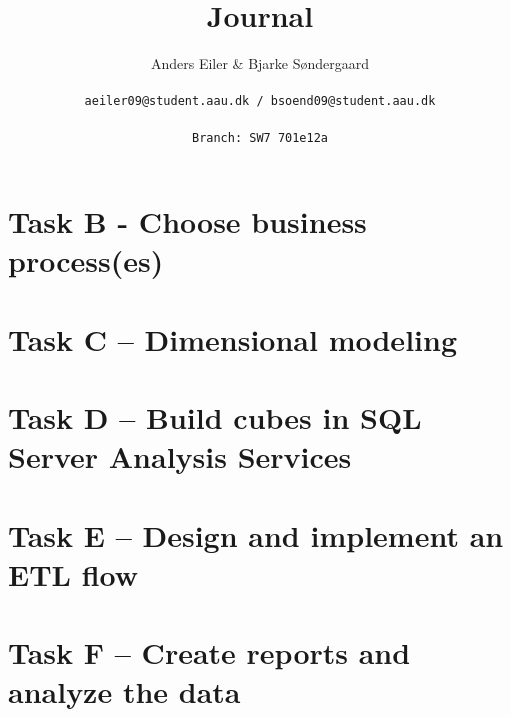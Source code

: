 \documentclass[a4paper,10pt]{article}
\title{Journal}
\author{Anders Eiler \& Bjarke Søndergaard \\
\rule{0pt}{4ex}\texttt{aeiler09@student.aau.dk / bsoend09@student.aau.dk} \\
\rule{0pt}{4ex}\texttt{Branch: SW7 701e12a}}
\begin{document}
    \maketitle
    \newpage
    
    \section{Task B - Choose business process(es)}
    
    
    \section{Task C – Dimensional modeling}
    

    \section{Task D – Build cubes in SQL Server Analysis Services}
    

    \section{Task E – Design and implement an ETL flow}
    

    \section{Task F – Create reports and analyze the data}
    
\end{document}
